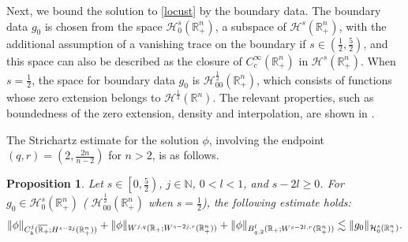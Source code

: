 \documentclass[preprint,compress,12pt]{elsarticle}
\newtheorem{proposition}[theorem]{Proposition}
\numberwithin{equation}{section}
\begin{document}
Next, we bound the solution to \eqref{locust} by the boundary data. The boundary data $g_{0}$ is chosen from the space $\mathcal{H}_{0}^{s}(\mathbb{R}^{n}_{+})$, a subspace of $\mathcal{H}^{s}(\mathbb{R}^{n}_{+})$, with the additional assumption of a vanishing trace on the boundary if $s\in(\frac{1}{2},\frac{5}{2})$, and this space can also be described as the closure of $C_{c}^{\infty}(\mathbb{R}^{n}_{+})$ in  $\mathcal{H}^{s}(\mathbb{R}^{n}_{+})$. When  $s=\frac{1}{2}$, the space for boundary data $g_{0}$ is $\mathcal{H}_{00}^{\frac{1}{2}}(\mathbb{R}^{n}_{+})$, which consists of functions whose zero extension belongs to $\mathcal{H}^{\frac{1}{2}}(\mathbb{R}^{n})$. The relevant properties, such as boundedness of the zero extension, density and interpolation, are shown in \cite{facilitate}.


The Strichartz estimate for the solution $\phi$, involving the endpoint $(q,r)=\left(2,\frac{2n}{n-2}\right)$ for $n>2$, is as follows.
\begin{proposition}\label{kiln}	
	Let $s\in\left[0, \frac{5}{2}\right)$, $j\in\mathbb{N}$, $0<l<1$, and $s-2l\geq0$. For $g_{0}\in\mathcal{H}_{0}^{s}(\mathbb{R}_{+}^{n})$ ( $\mathcal{H}_{00}^{\frac{1}{2}}(\mathbb{R}_{+}^{n})$ when $s=\frac{1}{2}$), the following estimate holds:
	\begin{equation}\label{detergent}	\|\phi\|_{C_{b}^{j}(\overline{\mathbb{R}_{+}\mkern-4mu}\,;H^{s-2j}(\mathbb{R}^{n}_{+}))}+\|\phi\|_{W^{j,q}(\mathbb{R}_{+};W ^{s-2j,r}(\mathbb{R}_{+}^{n}))}+\|\phi\|_{B^{l}_{q,2}(\mathbb{R}_{+};W^{s-2l,r}(\mathbb{R}^{n}_{+}))}\lesssim\|g_{0}\|_{\mathcal{H}_{0}^{s}{(\mathbb{R}_{+}^{n})}}.
	\end{equation}
\end{proposition}
\end{document}
